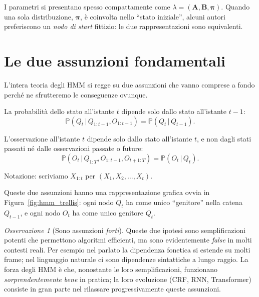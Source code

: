 \documentclass[11pt,a4paper,oneside]{book}
\theoremstyle{plain}
\theoremstyle{definition}
\theoremstyle{remark}
\newtheorem{osservazione}[teorema]{Osservazione}
\newcommand{\Prob}{\mathbb{P}}
\newcommand{\Amat}{\mathbf{A}}               %
\newcommand{\Bmat}{\mathbf{B}}               %
\newcommand{\initvec}{\boldsymbol{\pi}}      %
\newcommand{\hmm}{\lambda}                   %
\newcommand{\Tlen}{T}                        %
\newcommand{\given}{\,\vert\,}
\begin{document}
I parametri si presentano spesso compattamente come $\hmm=(\Amat,\Bmat,
\initvec)$. Quando una sola distribuzione, $\initvec$, è coinvolta nello
``stato iniziale'', alcuni autori preferiscono un \emph{nodo di start}
fittizio: le due rappresentazioni sono equivalenti.

\section{Le due assunzioni fondamentali}

L'intera teoria degli HMM si regge su due assunzioni che vanno
comprese a fondo perché ne sfrutteremo le conseguenze ovunque.

\begin{tcolorbox}[insightbox,title=Assunzione 1 -- Proprietà di Markov del primo ordine]
La probabilità dello stato all'istante $t$ dipende solo dallo stato
all'istante $t-1$:
\begin{equation}
    \Prob(Q_t \given Q_{1:t-1}, O_{1:t-1}) = \Prob(Q_t \given Q_{t-1}).
    \label{eq:markov_assumption}
\end{equation}
\end{tcolorbox}

\begin{tcolorbox}[insightbox,title=Assunzione 2 -- Output Independence]
L'osservazione all'istante $t$ dipende solo dallo stato all'istante
$t$, e non dagli stati passati né dalle osservazioni passate o future:
\begin{equation}
    \Prob(O_t \given Q_{1:\Tlen}, O_{1:t-1}, O_{t+1:\Tlen})
    = \Prob(O_t \given Q_t).
    \label{eq:output_independence}
\end{equation}
\end{tcolorbox}

Notazione: scriviamo $X_{1:t}$ per $(X_1,X_2,\dots,X_t)$.

Queste due assunzioni hanno una rappresentazione grafica ovvia in
Figura~\ref{fig:hmm_trellis}: ogni nodo $Q_t$ ha come unico ``genitore''
nella catena $Q_{t-1}$, e ogni nodo $O_t$ ha come unico genitore $Q_t$.

\begin{osservazione}[Sono assunzioni \emph{forti}]
Queste due ipotesi sono semplificazioni potenti che permettono
algoritmi efficienti, ma sono evidentemente \emph{false} in molti
contesti reali. Per esempio nel parlato la dipendenza fonetica si
estende su molti frame; nel linguaggio naturale ci sono dipendenze
sintattiche a lungo raggio. La forza degli HMM è che, nonostante le
loro semplificazioni, funzionano \emph{sorprendentemente bene} in
pratica; la loro evoluzione (CRF, RNN, Transformer) consiste in gran
parte nel rilassare progressivamente queste assunzioni.
\end{osservazione}
\end{document}
